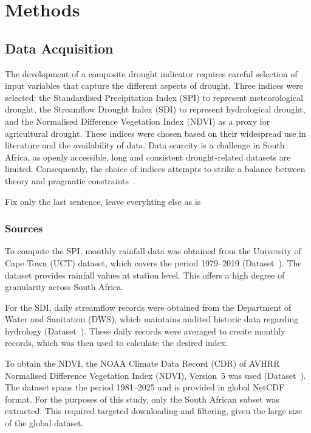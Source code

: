 \graphicspath{{methods/fig/}}

\chapter{Methods}
\label{chap:methods}
\section{Data Acquisition}
The development of a composite drought indicator requires careful selection of input variables that capture the different aspects of drought. Three indices were selected: the Standardised Precipitation Index (SPI) to represent meteorological drought, the Streamflow Drought Index (SDI) to represent hydrological drought, and the Normalised Difference Vegetation Index (NDVI) as a proxy for agricultural drought. These indices were chosen based on their widespread use in literature and the availability of data. Data scarcity is a challenge in South Africa, as openly accessible, long and consistent drought-related datasets are limited. Consequently, the choice of indices attempts to strike a balance between theory and pragmatic constraints~\cite{za_drought_review,za_drought_review2,dnbc_drought_first,dnbc_drought_second}.

Fix only the last sentence, leave everyhting else as is
\subsection{Sources}
\label{sec:data_sources}
To compute the SPI, monthly rainfall data was obtained from the University of Cape Town (UCT) dataset, which covers the period 1979–2019 (Dataset~\cite{uct_data}). The dataset provides rainfall values at station level. This offers a high degree of granularity across South Africa.

For the SDI, daily streamflow records were obtained from the Department of Water and Sanitation (DWS), which maintains audited historic data regarding hydrology (Dataset~\cite{DWS_2011}). These daily records were averaged to create monthly records, which was then used to calculate the desired index.

To obtain the NDVI, the NOAA Climate Data Record (CDR) of AVHRR Normalised Difference Vegetation Index (NDVI), Version~5 was used (Dataset~\cite{ndvi_data}). The dataset spans the period 1981–2025 and is provided in global NetCDF format. For the purposes of this study, only the South African subset was extracted. This required targeted downloading and filtering, given the large size of the global dataset.

